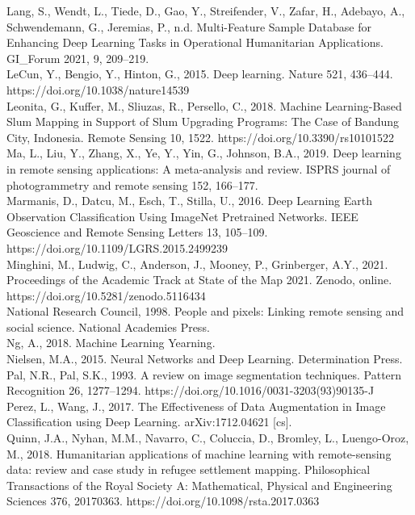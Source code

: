 \documentclass[11pt, a4paper, twoside]{report}
\begin{document}
Lang, S., Wendt, L., Tiede, D., Gao, Y., Streifender, V., Zafar, H., Adebayo, A., Schwendemann, G., Jeremias, P., n.d. Multi-Feature Sample Database for Enhancing Deep Learning Tasks in Operational Humanitarian Applications. GI\_Forum 2021, 9, 209–219.\\
LeCun, Y., Bengio, Y., Hinton, G., 2015. Deep learning. Nature 521, 436–444. https://doi.org/10.1038/nature14539\\
Leonita, G., Kuffer, M., Sliuzas, R., Persello, C., 2018. Machine Learning-Based Slum Mapping in Support of Slum Upgrading Programs: The Case of Bandung City, Indonesia. Remote Sensing 10, 1522. https://doi.org/10.3390/rs10101522\\
Ma, L., Liu, Y., Zhang, X., Ye, Y., Yin, G., Johnson, B.A., 2019. Deep learning in remote sensing applications: A meta-analysis and review. ISPRS journal of photogrammetry and remote sensing 152, 166–177.\\
Marmanis, D., Datcu, M., Esch, T., Stilla, U., 2016. Deep Learning Earth Observation Classification Using ImageNet Pretrained Networks. IEEE Geoscience and Remote Sensing Letters 13, 105–109. https://doi.org/10.1109/LGRS.2015.2499239\\
Minghini, M., Ludwig, C., Anderson, J., Mooney, P., Grinberger, A.Y., 2021. Proceedings of the Academic Track at State of the Map 2021. Zenodo, online. https://doi.org/10.5281/zenodo.5116434\\
National Research Council, 1998. People and pixels: Linking remote sensing and social science. National Academies Press.\\
Ng, A., 2018. Machine Learning Yearning.\\
Nielsen, M.A., 2015. Neural Networks and Deep Learning. Determination Press.\\
Pal, N.R., Pal, S.K., 1993. A review on image segmentation techniques. Pattern Recognition 26, 1277–1294. https://doi.org/10.1016/0031-3203(93)90135-J\\
Perez, L., Wang, J., 2017. The Effectiveness of Data Augmentation in Image Classification using Deep Learning. arXiv:1712.04621 [cs].\\
Quinn, J.A., Nyhan, M.M., Navarro, C., Coluccia, D., Bromley, L., Luengo-Oroz, M., 2018. Humanitarian applications of machine learning with remote-sensing data: review and case study in refugee settlement mapping. Philosophical Transactions of the Royal Society A: Mathematical, Physical and Engineering Sciences 376, 20170363. https://doi.org/10.1098/rsta.2017.0363\\
\end{document}
